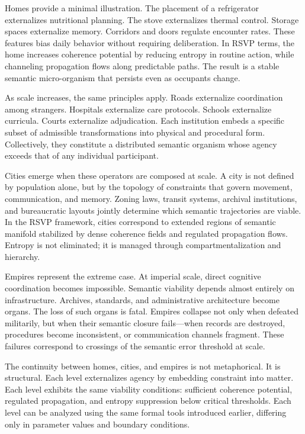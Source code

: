 \documentclass[11pt,oneside]{article}
\begin{document}
Homes provide a minimal illustration. The placement of a refrigerator externalizes nutritional planning. The stove externalizes thermal control. Storage spaces externalize memory. Corridors and doors regulate encounter rates. These features bias daily behavior without requiring deliberation. In RSVP terms, the home increases coherence potential by reducing entropy in routine action, while channeling propagation flows along predictable paths. The result is a stable semantic micro-organism that persists even as occupants change.

As scale increases, the same principles apply. Roads externalize coordination among strangers. Hospitals externalize care protocols. Schools externalize curricula. Courts externalize adjudication. Each institution embeds a specific subset of admissible transformations into physical and procedural form. Collectively, they constitute a distributed semantic organism whose agency exceeds that of any individual participant.

Cities emerge when these operators are composed at scale. A city is not defined by population alone, but by the topology of constraints that govern movement, communication, and memory. Zoning laws, transit systems, archival institutions, and bureaucratic layouts jointly determine which semantic trajectories are viable. In the RSVP framework, cities correspond to extended regions of semantic manifold stabilized by dense coherence fields and regulated propagation flows. Entropy is not eliminated; it is managed through compartmentalization and hierarchy.

Empires represent the extreme case. At imperial scale, direct cognitive coordination becomes impossible. Semantic viability depends almost entirely on infrastructure. Archives, standards, and administrative architecture become organs. The loss of such organs is fatal. Empires collapse not only when defeated militarily, but when their semantic closure fails—when records are destroyed, procedures become inconsistent, or communication channels fragment. These failures correspond to crossings of the semantic error threshold at scale.

The continuity between homes, cities, and empires is not metaphorical. It is structural. Each level externalizes agency by embedding constraint into matter. Each level exhibits the same viability conditions: sufficient coherence potential, regulated propagation, and entropy suppression below critical thresholds. Each level can be analyzed using the same formal tools introduced earlier, differing only in parameter values and boundary conditions.
\end{document}
